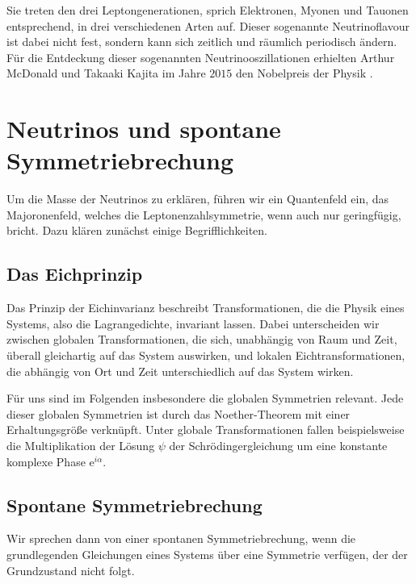 Sie treten den drei Leptongenerationen, sprich Elektronen, Myonen und Tauonen entsprechend, in drei verschiedenen Arten auf.
Dieser sogenannte Neutrinoflavour ist dabei nicht fest, sondern kann sich zeitlich und räumlich periodisch ändern.
Für die Entdeckung dieser sogenannten Neutrinooszillationen erhielten Arthur McDonald und Takaaki Kajita im Jahre $2015$ den Nobelpreis der Physik \cite[S. ~19]{oberauer}.



\section{Neutrinos und spontane Symmetriebrechung}

Um die Masse der Neutrinos zu erklären, führen wir ein Quantenfeld ein, das Majoronenfeld, welches die Leptonenzahlsymmetrie, wenn auch nur geringfügig, bricht.
Dazu klären zunächst einige Begrifflichkeiten.

\subsection{Das Eichprinzip} %

Das Prinzip der Eichinvarianz beschreibt Transformationen, die die Physik eines Systems, also die Lagrangedichte, invariant lassen.
Dabei unterscheiden wir zwischen globalen Transformationen, die sich, unabhängig von Raum und Zeit, überall gleichartig auf das System auswirken, und lokalen Eichtransformationen, 
die abhängig von Ort und Zeit unterschiedlich auf das System wirken.

Für uns sind im Folgenden insbesondere die globalen Symmetrien relevant.
Jede dieser globalen Symmetrien ist durch das Noether-Theorem mit einer Erhaltungsgröße verknüpft.
Unter globale Transformationen fallen beispielsweise die Multiplikation der Lösung $\psi$ der Schrödingergleichung um eine konstante komplexe Phase $\mathrm{e}^{i \alpha}$.

\subsection{Spontane Symmetriebrechung} %

Wir sprechen dann von einer spontanen Symmetriebrechung, wenn die grundlegenden Gleichungen eines Systems über eine Symmetrie verfügen, der der Grundzustand nicht folgt.

